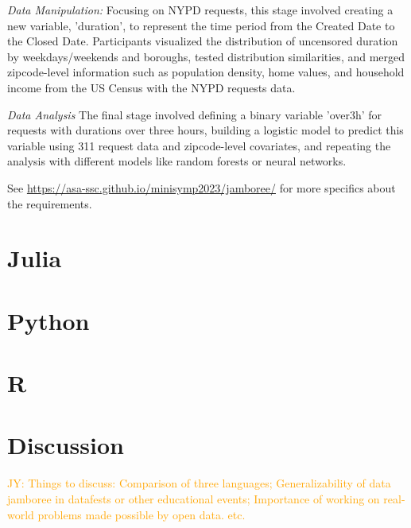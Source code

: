 \documentclass[12pt, letterpaper]{article}
\newcommand{\jy}[1]{\textcolor{orange}{JY: #1}}
\begin{document}
\emph{Data Manipulation:} Focusing on NYPD requests, this stage involved
creating a new variable, 'duration', to represent the time period from the
Created Date to the Closed Date. Participants visualized the distribution of
uncensored duration by weekdays/weekends and boroughs, tested distribution
similarities, and merged zipcode-level information such as population density,
home values, and household income from the US Census with the NYPD requests
data.

\emph{Data Analysis} The final stage involved defining a binary variable
'over3h' for requests with durations over three hours, building a logistic model
to predict this variable using 311 request data and zipcode-level covariates,
and repeating the analysis with different models like random forests or neural
networks.

See \url{https://asa-ssc.github.io/minisymp2023/jamboree/} for more specifics
about the requirements.

\section{Julia}
\label{sec:julia}


\section{Python}
\label{sec:python}

\section{R}
\label{sec:r}


\section{Discussion}
\label{sec:disc}

\jy{Things to discuss:
  Comparison of three languages;
  Generalizability of data jamboree in datafests or other educational events;
  Importance of working on real-world problems made possible by open data.
  etc.}



\end{document}
